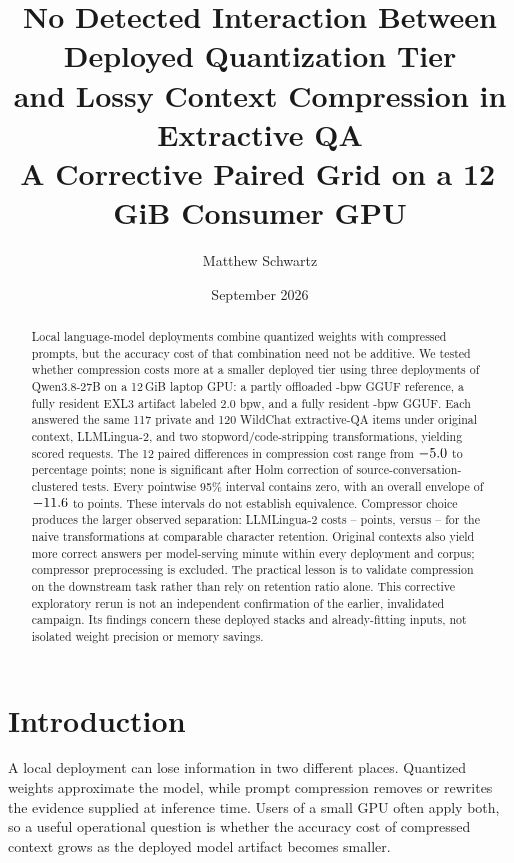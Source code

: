 \documentclass[11pt]{article}
\title{\textbf{No Detected Interaction Between Deployed Quantization Tier\\
and Lossy Context Compression in Extractive QA}\\[0.25em]
\large A Corrective Paired Grid on a 12\,GiB Consumer GPU}
\author{Matthew Schwartz\singleauthorinfo{Independent researcher \enspace
\href{https://orcid.org/0009-0009-4171-7247}{ORCID 0009-0009-4171-7247}
\enspace \texttt{matthew.schwartz.research@gmail.com}}}
\date{September 2026}
\begin{document}
\maketitle

\begin{abstract}
Local language-model deployments combine quantized weights with compressed
prompts, but the accuracy cost of that combination need not be additive.
We tested whether compression costs more at a smaller deployed tier using
three deployments of Qwen3.8-27B
on a 12\,GiB laptop GPU: a partly offloaded \PtwoQfBpw-bpw GGUF reference,
a fully resident EXL3 artifact labeled 2.0 bpw, and a fully resident
\PtwoIqBpw-bpw GGUF. Each answered the same 117 private and 120 WildChat
extractive-QA items under original context, LLMLingua-2, and two
stopword/code-stripping transformations, yielding \PtwoNRequests{} scored
requests. The 12 paired differences in compression cost range from
$-5.0$ to \PtwoInterDeltaMax{} percentage points; none is
significant after Holm correction of source-conversation-clustered tests.
Every pointwise 95\% interval contains zero, with an overall envelope of
$-11.6$ to \PtwoInterCiHighMax{} points. These intervals do not
establish equivalence. Compressor choice produces the larger observed
separation: LLMLingua-2 costs \PtwoLDelMin--\PtwoLDelMax{} points, versus
\PtwoNaiveDelMin--\PtwoNaiveDelMax{} for the naive transformations at comparable
character retention. Original contexts also yield more correct answers per
model-serving minute within every deployment and corpus; compressor
preprocessing is excluded. The practical lesson is to validate compression
on the downstream task rather than rely on retention ratio alone. This
corrective exploratory rerun is not an independent confirmation of the earlier,
invalidated campaign. Its findings concern these deployed stacks and
already-fitting inputs, not isolated weight precision or memory savings.
\end{abstract}

\section{Introduction}

A local deployment can lose information in two different places. Quantized
weights approximate the model, while prompt compression removes or rewrites
the evidence supplied at inference time. Users of a small GPU often apply both,
so a useful operational question is whether the accuracy cost of compressed
context grows as the deployed model artifact becomes smaller.
\end{document}
